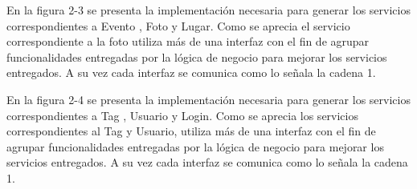 \documentclass{memoria}
\begin{document}
En la figura 2-3 se presenta la implementación necesaria para generar los servicios correspondientes a Evento , Foto y Lugar. Como se aprecia el servicio correspondiente a la foto utiliza más de una interfaz con el fin de agrupar funcionalidades entregadas por la lógica de negocio para mejorar los servicios entregados. A su vez cada interfaz se comunica como lo señala la cadena 1.


En la figura 2-4 se presenta la implementación necesaria para generar los servicios correspondientes a Tag , Usuario y Login. Como se aprecia los servicios correspondientes al Tag y Usuario, utiliza más de una interfaz con el fin de agrupar funcionalidades entregadas por la lógica de negocio para mejorar los servicios entregados. A su vez cada interfaz se comunica como lo señala la cadena 1.

\newpage
{}
\end{document}
